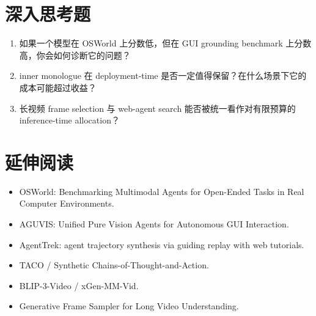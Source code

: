 \section{深入思考题}
\begin{enumerate}
\item 如果一个模型在 OSWorld 上分数低，但在 GUI grounding benchmark 上分数高，你会如何诊断它的问题？
\item inner monologue 在 deployment-time 是否一定值得保留？在什么场景下它的成本可能超过收益？
\item 长视频 frame selection 与 web-agent search 能否被统一看作对有限预算的 inference-time allocation？
\end{enumerate}

\section{延伸阅读}
\begin{itemize}
\item OSWorld: Benchmarking Multimodal Agents for Open-Ended Tasks in Real Computer Environments.
\item AGUVIS: Unified Pure Vision Agents for Autonomous GUI Interaction.
\item AgentTrek: agent trajectory synthesis via guiding replay with web tutorials.
\item TACO / Synthetic Chains-of-Thought-and-Action.
\item BLIP-3-Video / xGen-MM-Vid.
\item Generative Frame Sampler for Long Video Understanding.
\end{itemize}

